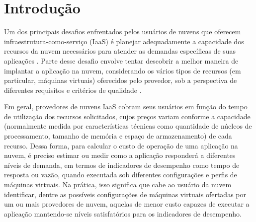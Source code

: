 \documentclass[12pt]{article}
\begin{document}
\section{Introdução}\label{sec:intro}


Um dos principais desafios enfrentados pelos usuários de nuvens que oferecem infraestrutura-como-serviço (IaaS) é planejar adequadamente a capacidade dos recursos da nuvem necessários para atender as demandas específicas de suas aplicações \cite{Menasce2009}.  Parte desse desafio envolve tentar descobrir a melhor maneira de implantar a aplicação na nuvem, considerando os vários tipos de recursos (em particular, máquinas virtuais) oferecidos pelo provedor, sob a perspectiva de diferentes requisitos e critérios de qualidade \cite{GoncalvesJunior2015}.  

Em geral, provedores de nuvens IaaS cobram seus usuários em função do tempo de utilização dos recursos solicitados, cujos preços variam conforme a capacidade (normalmente medida por características técnicas como quantidade de núcleos de processamento, tamanho de memória e espaço de armazenamento) de cada recurso. Dessa forma, para calcular o custo de operação de uma aplicação na nuvem, é preciso estimar ou medir como a aplicação responderá a diferentes níveis de demanda, em termos de indicadores de desempenho como tempo de resposta ou vazão, quando executada sob diferentes configurações e perfis de máquinas virtuais. Na prática, isso significa que cabe ao usuário da nuvem identificar, dentre as possíveis configurações de máquinas virtuais ofertadas por um ou mais provedores de nuvem, aquelas de menor custo capazes de executar a aplicação mantendo-se níveis satisfatórios para os indicadores de desempenho.

\end{document}
